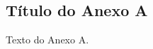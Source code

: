
\begin{anexosenv}
	
	\partanexos
	
	\chapter{Título do Anexo A}
	
	Texto do Anexo A.
	

	
	
\end{anexosenv}